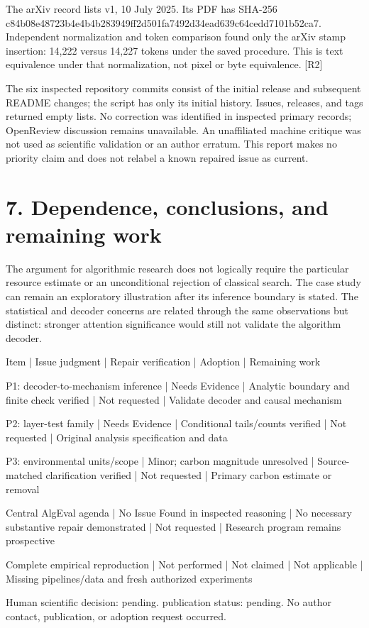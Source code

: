 \documentclass[10pt]{article}
\begin{document}
The arXiv record lists v1, 10 July 2025. Its PDF has SHA-256 c84b08e48723b4e4b4b283949ff2d501fa7492d34ead639c64cedd7101b52ca7. Independent normalization and token comparison found only the arXiv stamp insertion: 14,222 versus 14,227 tokens under the saved procedure. This is text equivalence under that normalization, not pixel or byte equivalence. [R2]\par
The six inspected repository commits consist of the initial release and subsequent README changes; the script has only its initial history. Issues, releases, and tags returned empty lists. No correction was identified in inspected primary records; OpenReview discussion remains unavailable. An unaffiliated machine critique was not used as scientific validation or an author erratum. This report makes no priority claim and does not relabel a known repaired issue as current.\par
\section*{7. Dependence, conclusions, and remaining work}
The argument for algorithmic research does not logically require the particular resource estimate or an unconditional rejection of classical search. The case study can remain an exploratory illustration after its inference boundary is stated. The statistical and decoder concerns are related through the same observations but distinct: stronger attention significance would still not validate the algorithm decoder.\par
Item | Issue judgment | Repair verification | Adoption | Remaining work\par
P1: decoder-to-mechanism inference | Needs Evidence | Analytic boundary and finite check verified | Not requested | Validate decoder and causal mechanism\par
P2: layer-test family | Needs Evidence | Conditional tails/counts verified | Not requested | Original analysis specification and data\par
P3: environmental units/scope | Minor; carbon magnitude unresolved | Source-matched clarification verified | Not requested | Primary carbon estimate or removal\par
Central AlgEval agenda | No Issue Found in inspected reasoning | No necessary substantive repair demonstrated | Not requested | Research program remains prospective\par
Complete empirical reproduction | Not performed | Not claimed | Not applicable | Missing pipelines/data and fresh authorized experiments\par
Human scientific decision: pending. publication status: pending. No author contact, publication, or adoption request occurred.\par
\end{document}

